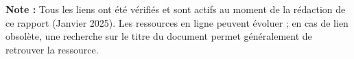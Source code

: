 \documentclass[12pt,a4paper]{report}
\begin{document}
\vspace{1cm}

\noindent
\textbf{Note :} Tous les liens ont été vérifiés et sont actifs au moment de la rédaction de ce rapport (Janvier 2025). Les ressources en ligne peuvent évoluer ; en cas de lien obsolète, une recherche sur le titre du document permet généralement de retrouver la ressource.

\clearpage
\end{document}
